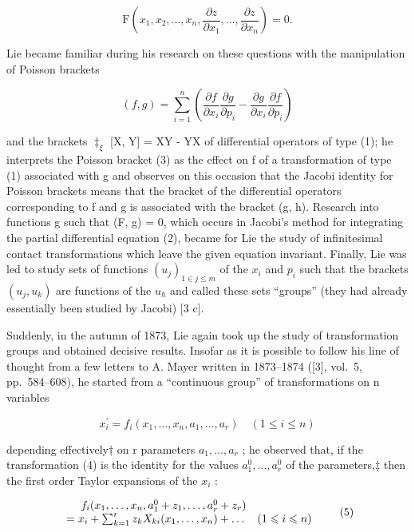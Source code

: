\[
\mathrm{F} \left(x _ {1}, x _ {2}, \dots , x _ {n}, \frac {\partial z}{\partial x _ {1}}, \dots , \frac {\partial z}{\partial x _ {n}}\right) = 0.\tag{2}
\]

Lie became familiar during his research on these questions with the manipulation of Poisson brackets

\[
(f, g) = \sum_ {i = 1} ^ {n} \left(\frac {\partial f}{\partial x _ {i}} \frac {\partial g}{\partial p _ {i}} - \frac {\partial g}{\partial x _ {i}} \frac {\partial f}{\partial p _ {i}}\right)\tag{3}
\]

and the brackets \(\ddagger_{\xi}\) {[}X, Y{]} = XY - YX of differential operators of type (1); he interprets the Poisson bracket (3) as the effect on f of a transformation of type (1) associated with g and observes on this occasion that the Jacobi identity for Poisson brackets means that the bracket of the differential operators corresponding to f and g is associated with the bracket (g, h). Research into functions g such that (F, g) = 0, which occurs in Jacobi's method for integrating the partial differential equation (2), became for Lie the study of infinitesimal contact transformations which leave the given equation invariant. Finally, Lie was led to study sets of functions \((u_{j})_{1 \in j \leq m}\) of the \(x_{i}\) and \(p_{i}\) such that the brackets \((u_{j}, u_{k})\) are functions of the \(u_{h}\) and called these sets ``groups'' (they had already essentially been studied by Jacobi) {[}3 c{]}.


Suddenly, in the autumn of 1873, Lie again took up the study of transformation groups and obtained decisive results. Insofar as it is possible to follow his line of thought from a few letters to A. Mayer written in 1873--1874 ({[}3{]}, vol.~5, pp.~584--608), he started from a ``continuous group'' of transformations on n variables

\[
x _ {i} ^ {\prime} = f _ {i} (x _ {1}, \dots , x _ {n}, a _ {1}, \dots , a _ {r}) \quad (1 \leqslant i \leqslant n)\tag{4}
\]

depending effectively† on r parameters \(a_{1},\ldots,a_{r}\) ; he observed that, if the transformation (4) is the identity for the values \(a_{1}^{0},\ldots,a_{r}^{0}\) of the parameters,‡ then the first order Taylor expansions of the \(x_{i}\) :

\[
\begin{array}{r l} f _ {i} (x _ {1}, \dots , x _ {n}, a _ {1} ^ {0} + z _ {1}, \dots , a _ {r} ^ {0} + z _ {r}) & \\ = x _ {i} + \sum_ {k = 1} ^ {r} z _ {k} X _ {k i} (x _ {1}, \dots , x _ {n}) + \dots & (1 \leqslant i \leqslant n) \end{array} \tag {5}
\]

